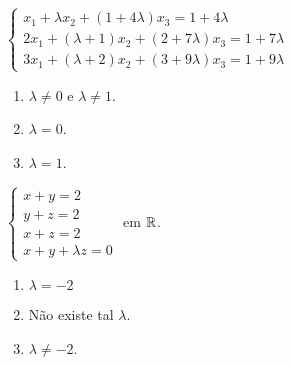 \documentclass[12pt]{exam}
\begin{document}
\begin{exercicio}
  $
    \begin{cases}
      x_1 + \lambda x_2 + (1 + 4\lambda )x_3 = 1 + 4\lambda \\
      2x_1 + (\lambda  + 1)x_2 + (2 + 7\lambda )x_3 = 1 + 7\lambda \\
      3x_1 + (\lambda  + 2)x_2 + (3 + 9\lambda )x_3 = 1 + 9\lambda 
    \end{cases}  
  $
  \begin{solucao}
    \begin{enumerate}[label={\alph*})]
      \item $\lambda \ne 0$ e $\lambda \ne 1$.
      \item $\lambda = 0$.
      \item $\lambda = 1$.
    \end{enumerate}
  \end{solucao}
\end{exercicio}

\begin{exercicio}\label{sistemasfim}
  $
    \begin{cases}
      x + y = 2\\
      y + z = 2\\
      x + z = 2\\
      x + y + \lambda z = 0
    \end{cases}
  $
  em $\mathbb{R}$.
  \begin{solucao}
    \begin{enumerate}[label={\alph*})]
      \item $\lambda = -2$
      \item N\~ao existe tal $\lambda$.
      \item $\lambda \ne -2$.
    \end{enumerate}
  \end{solucao}
\end{exercicio}
\end{document}
